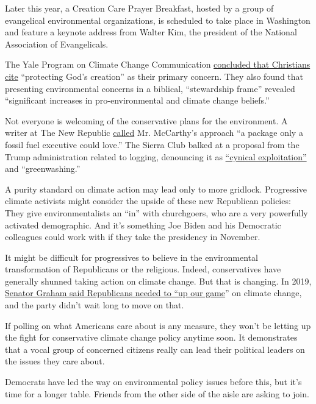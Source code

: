 Later this year, a Creation Care Prayer Breakfast, hosted by a group of
evangelical environmental organizations, is scheduled to take place in
Washington and feature a keynote address from Walter Kim, the president
of the National Association of Evangelicals.

The Yale Program on Climate Change Communication
\href{https://climatecommunication.yale.edu/publications/engaging-christians-in-the-issue-of-climate-change/}{concluded
that Christians cite} ``protecting God's creation'' as their primary
concern. They also found that presenting environmental concerns in a
biblical, ``stewardship frame'' revealed ``significant increases in
pro-environmental and climate change beliefs.''

Not everyone is welcoming of the conservative plans for the environment.
A writer at The New Republic
\href{https://newrepublic.com/article/156269/republicans-climate-change-plan-big-oils-climate-change-plan}{called}
Mr. McCarthy's approach ``a package only a fossil fuel executive could
love.'' The Sierra Club balked at a proposal from the Trump
administration related to logging, denouncing it as
\href{https://www.sierraclub.org/sierra/donald-trump-s-greenwashing-climate-crisis}{``cynical
exploitation''} and ``greenwashing.''

A purity standard on climate action may lead only to more gridlock.
Progressive climate activists might consider the upside of these new
Republican policies: They give environmentalists an ``in'' with
churchgoers, who are a very powerfully activated demographic. And it's
something Joe Biden and his Democratic colleagues could work with if
they take the presidency in November.

It might be difficult for progressives to believe in the environmental
transformation of Republicans or the religious. Indeed, conservatives
have generally shunned taking action on climate change. But that is
changing. In 2019,
\href{https://www.mcclatchydc.com/news/politics-government/congress/article232467697.html}{Senator
Graham said Republicans needed to ``up our game}'' on climate change,
and the party didn't wait long to move on that.

If polling on what Americans care about is any measure, they won't be
letting up the fight for conservative climate change policy anytime
soon. It demonstrates that a vocal group of concerned citizens really
can lead their political leaders on the issues they care about.

Democrats have led the way on environmental policy issues before this,
but it's time for a longer table. Friends from the other side of the
aisle are asking to join.

